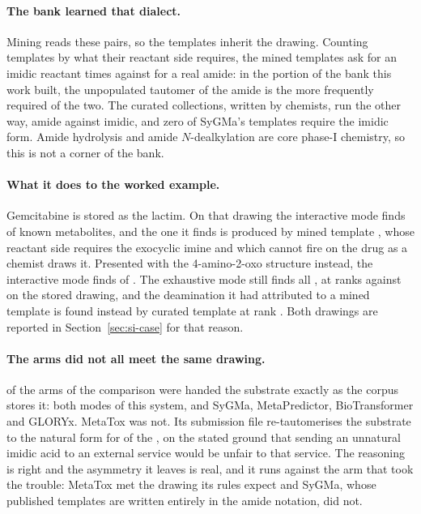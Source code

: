 \documentclass[journal=jcisd8,manuscript=suppinfo,layout=onecolumn]{achemso}
\begin{document}
\paragraph{The bank learned that dialect.} Mining reads these pairs, so the templates inherit the
drawing. Counting templates by what their reactant side requires, the mined templates ask for an
imidic reactant \numDialectBankMinedimidic{} times against \numDialectBankMinedamide{} for a real
amide: in the portion of the bank this work built, the unpopulated tautomer of the amide is the more
frequently required of the two. The curated collections, written by chemists, run the other way,
\numDialectBankCuratedamide{} amide against \numDialectBankCuratedimidic{} imidic, and zero of
SyGMa's \numSygmaRules{} templates require the imidic form. Amide hydrolysis and amide
$N$-dealkylation are core phase-I chemistry, so this is not a corner of the bank.

\paragraph{What it does to the worked example.} Gemcitabine is stored as the lactim. On that
drawing the interactive mode finds \numCaseInterFound{} of \numCaseReferences{} known
metabolites, and the one it finds is produced by mined template \numCaseInterRulehit{}, whose
reactant side requires the exocyclic imine and which cannot fire on the drug as a chemist draws
it. Presented with the 4-amino-2-oxo structure instead, the interactive mode finds
\numCaseInterdrawnFound{} of \numCaseReferences{}. The exhaustive mode still finds all
\numCaseExhdrawnFound{}, at ranks \numCaseExhdrawnRanks{} against \numCaseExhRanks{} on the stored
drawing, and the deamination it had attributed to a mined template is found instead by curated
template \numCaseExhdrawnDeamrule{} at rank \numCaseExhdrawnDeamrank{}. Both drawings are reported
in Section~\ref{sec:si-case} for that reason.

\paragraph{The arms did not all meet the same drawing.} \numChemDrawnstoredWord{} of the
\numChemArmsWord{} arms of the comparison were handed the substrate exactly as the corpus
stores it: both modes of this system, and SyGMa, MetaPredictor, BioTransformer and GLORYx.
MetaTox was not. Its submission file re-tautomerises the substrate to the
natural form for \numDialectMetatoxretaut{} of the \numDialectMetatoxn{}, on the stated ground that
sending an unnatural
imidic acid to an external service would be unfair to that service. The reasoning is right and the
asymmetry it leaves is real, and it runs against the arm that took the trouble: MetaTox met the
drawing its rules expect and SyGMa, whose published templates are written entirely in the amide
notation, did not.
\end{document}
